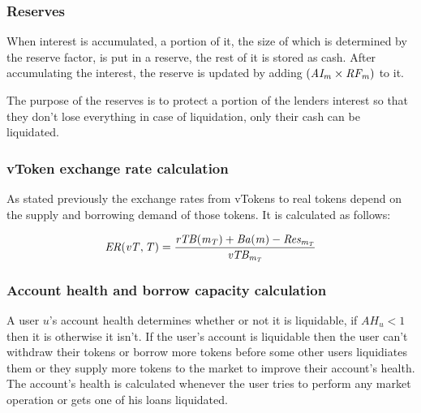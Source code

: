 \subsubsection{Reserves}

When interest is accumulated, a portion of it, the size of which is determined by the reserve factor, is put in a reserve, the rest of it is stored as cash. After accumulating the interest, the reserve is updated by adding $(\mathit{AI_{m}} \times \mathit{RF_{m}})$ to it.

The purpose of the reserves is to protect a portion of the lenders interest so that they don't lose everything in case of liquidation, only their cash can be liquidated. 

\subsubsection{vToken exchange rate calculation}

As stated previously the exchange rates from vTokens to real tokens depend on the supply and borrowing demand of those tokens. It is calculated as follows:

$$
\mathit{ER(vT, T)} = \frac{\mathit{rTB(\mathit{m_{T}})} + \mathit{Ba(m)} - \mathit{Res_{\mathit{m_{T}}}}}{\mathit{vTB_{\mathit{m_{T}}}}}
$$

\subsubsection{Account health and borrow capacity calculation}

A user $u$'s account health determines whether or not it is liquidable, if $AH_u < 1$ then it is otherwise it isn't. If the user's account is liquidable then the user can't withdraw their tokens or borrow more tokens before some other users liquidiates them or they supply more tokens to the market to improve their account's health. The account's health is calculated whenever the user tries to perform any market operation or gets one of his loans liquidated.

